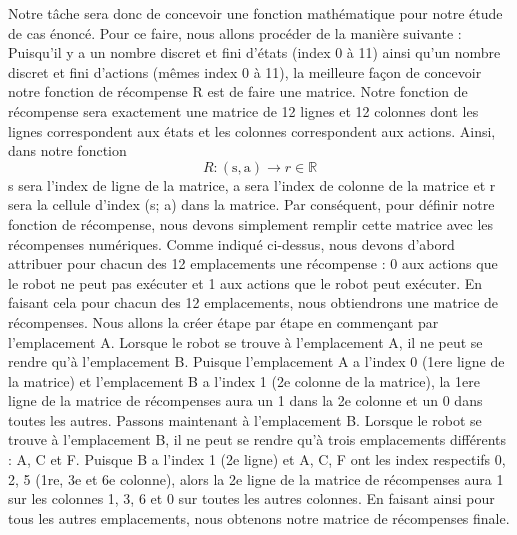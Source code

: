 \documentclass{article}
\begin{document}
Notre tâche sera donc de concevoir une fonction mathématique pour notre étude de cas énoncé. Pour ce faire, nous allons procéder de la manière suivante : 
Puisqu'il y a un nombre discret et fini d'états (index 0 à 11) ainsi qu'un nombre discret et fini d'actions (mêmes index 0 à 11), la meilleure façon de concevoir notre fonction de récompense R est de faire une matrice. Notre fonction de récompense sera exactement une matrice de 12 lignes et 12 colonnes dont les lignes correspondent aux états et les colonnes correspondent aux actions. Ainsi, dans notre fonction  \[ R: (\text{s}, \text{a}) \rightarrow r \in \mathbb{R} \] s sera l'index de ligne de la matrice, a sera l'index de colonne de la matrice et r sera la cellule d'index (s; a) dans la matrice. Par conséquent, pour définir notre fonction de récompense, nous devons simplement remplir cette matrice avec les récompenses numériques. Comme indiqué ci-dessus, nous devons d'abord attribuer pour chacun des 12 emplacements une récompense : 0 aux actions que le robot ne peut pas exécuter et 1 aux actions que le robot peut exécuter. En faisant cela pour chacun des 12 emplacements, nous obtiendrons une matrice de récompenses. Nous allons la créer étape par étape en commençant par l'emplacement A. Lorsque le robot se trouve à l'emplacement A, il ne peut se rendre qu'à l'emplacement B. Puisque l'emplacement
A a l'index 0 (1ere ligne de la matrice) et l'emplacement B a l'index 1 (2e colonne de la matrice), la 1ere ligne de la matrice de récompenses aura un 1 dans la 2e colonne et un 0 dans toutes les autres. Passons maintenant à l'emplacement B. Lorsque le robot se trouve à l'emplacement B, il ne peut se rendre qu'à trois emplacements différents : A, C et F. Puisque B a l'index 1 (2e ligne) et A, C, F ont les index respectifs 0, 2, 5 (1re, 3e et 6e colonne), alors la 2e ligne de la matrice de récompenses aura 1 sur les colonnes 1, 3, 6 et 0 sur toutes les autres colonnes. En faisant ainsi pour tous les autres emplacements, nous obtenons notre matrice de récompenses finale.
\end{document}
